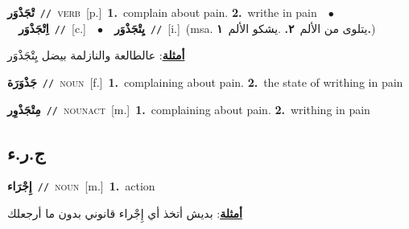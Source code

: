 \documentclass[10pt,a4paper,twoside]{article} %
\begin{document}
\begin{multicols}{2}
{\setlength\topsep{0pt}\textbf{\foreignlanguage{arabic}{تْجَذْوَر}}\ {\color{gray}\texttt{//}\color{black}}\ \textsc{verb}\ [p.]\ \textbf{1.}~complain about pain.  \textbf{2.}~writhe in pain\ \ $\bullet$\ \ \setlength\topsep{0pt}\textbf{\foreignlanguage{arabic}{اِتْجَذْوَر}}\ {\color{gray}\texttt{//}\color{black}}\ [c.]\ \ $\bullet$\ \ \setlength\topsep{0pt}\textbf{\foreignlanguage{arabic}{يِتْجَذْوَر}}\ {\color{gray}\texttt{//}\color{black}}\ [i.]\ \color{gray}(msa. \foreignlanguage{arabic}{يتلوى من الألم}~\foreignlanguage{arabic}{\textbf{٢.}}  .\foreignlanguage{arabic}{يشكو الألم}~\foreignlanguage{arabic}{\textbf{١.}})\color{black}\  \begin{flushright}\color{gray}\foreignlanguage{arabic}{\textbf{\underline{\foreignlanguage{arabic}{أمثلة}}}: عالطالعة والنازلمة بيضل يِتْجَذْوَر}\end{flushright}\color{black}} \vspace{2mm}

{\setlength\topsep{0pt}\textbf{\foreignlanguage{arabic}{جَذْوَرَة}}\ {\color{gray}\texttt{//}\color{black}}\ \textsc{noun}\ [f.]\ \textbf{1.}~complaining about pain.  \textbf{2.}~the state of writhing in pain\ } \vspace{2mm}

{\setlength\topsep{0pt}\textbf{\foreignlanguage{arabic}{مِتْجَذْوِر}}\ {\color{gray}\texttt{//}\color{black}}\ \textsc{noun\textunderscore act}\ [m.]\ \textbf{1.}~complaining about pain.  \textbf{2.}~writhing in pain\ } \vspace{2mm}

\vspace{-3mm}
\subsection*{\color{blue}\foreignlanguage{arabic}{ج.ر.ء}\color{blue}{}} 

{\setlength\topsep{0pt}\textbf{\foreignlanguage{arabic}{إِجْرَاء}}\ {\color{gray}\texttt{//}\color{black}}\ \textsc{noun}\ [m.]\ \textbf{1.}~action\  \begin{flushright}\color{gray}\foreignlanguage{arabic}{\textbf{\underline{\foreignlanguage{arabic}{أمثلة}}}: بديش أتخذ أي إِجْراء قانوني بدون ما أرجعلك}\end{flushright}\color{black}} \vspace{2mm}


\end{multicols}
\end{document}
